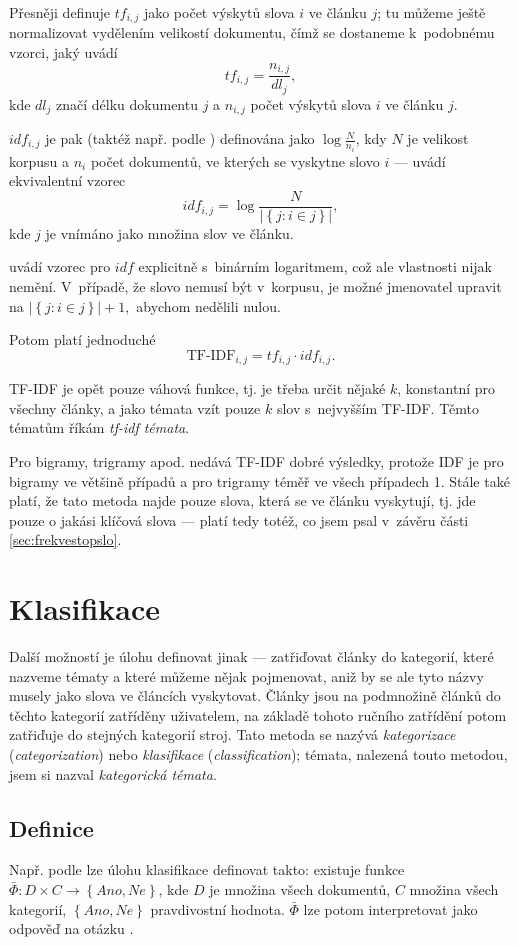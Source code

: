 \documentclass[12pt,a4paper]{report}
\begin{document}
Přesněji definuje \cite{understanding} $tf_{i,j}$  jako počet výskytů slova $i$ ve článku $j$; tu můžeme ještě normalizovat vydělením velikostí do\-ku\-men\-tu, čímž se do\-sta\-ne\-me k~podobnému vzorci, jaký uvádí \cite{wikitfidf} $$tf_{i,j}=\frac{n_{i,j}}{dl_j},$$ kde $dl_j$ značí délku dokumentu $j$ a $n_{i,j}$ počet výskytů slova $i$ ve článku $j$.

$idf_{i,j}$ je pak (taktéž např. podle \cite{understanding}) definována jako $\log\frac{N}{n_i}$, kdy $N$ je velikost korpusu a $n_i$ počet dokumentů, ve kterých se vyskytne slovo $i$ --- \cite{wikitfidf} uvádí ekvivalentní vzorec $$idf_{i,j}=\log\frac{N}{\left|\left\{j: i \in j\right\}\right|},$$ kde $j$ je vnímáno jako množina slov ve článku.

\cite{introduction} uvádí vzorec pro $idf$ explicitně s~binárním logaritmem, což ale vlastnosti nijak nemění. V~případě, že slovo nemusí být v~korpusu, je možné jmenovatel upravit na $\left|\left\{j: i \in j\right\}\right|+1,$ abychom nedělili nulou.

Potom platí jednoduché $$\mbox{TF-IDF}_{i,j}=tf_{i,j}\cdot idf_{i,j}.$$

TF-IDF je opět pouze váhová funkce, tj. je třeba určit nějaké $k$, konstantní pro všechny články, a jako témata vzít pouze  $k$ slov s~nejvyšším TF-IDF. Těmto tématům říkám \emph{tf-idf témata}.

Pro bigramy, trigramy apod. nedává TF-IDF dobré výsledky, protože IDF je pro bigramy ve většině případů a pro trigramy téměř ve všech případech 1. Stále také platí, že tato metoda najde pouze slova, která se ve článku vyskytují, tj. jde pouze o jakási klíčová slova --- platí tedy totéž, co jsem psal v~závěru části \ref{sec:frekvestopslo}.

\section{Klasifikace}
\label{sec:kategorizace}
Další možností je úlohu definovat jinak --- zatřiďovat články do kategorií, které nazveme tématy a které můžeme nějak pojmenovat, aniž by se ale tyto názvy musely jako slova ve článcích vyskytovat. Články jsou na podmnožině článků do těchto kategorií zatříděny uživatelem, na základě tohoto ručního zatřídění potom zatřiďuje do stejných kategorií stroj. Tato metoda se nazývá \emph{kategorizace} (\emph{categorization}) nebo \emph{klasifikace} (\emph{classification}); témata, nalezená touto metodou, jsem si nazval \emph{kategorická témata}.

\subsection{Definice}
 \label{sec:kategorizace_def}
Např. podle \cite{machine_intro} lze úlohu klasifikace definovat takto: existuje funkce $\bar{\Phi}: D \times C \rightarrow \left\{Ano, Ne\right\}$, kde $D$ je množina všech dokumentů, $C$ množina všech kategorií, $\left\{Ano, Ne\right\}$ pravdivostní hodnota. $\bar{\Phi}$ lze potom interpretovat jako odpověď na otázku .
\end{document}
